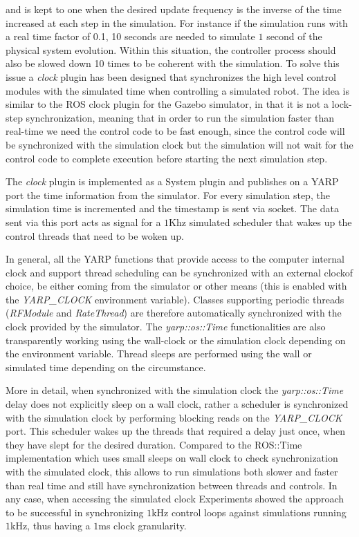 and is kept to one when the desired update frequency is the inverse of the time increased at each step in the simulation.
For instance if the simulation runs with a real time factor of 0.1, 10 seconds are needed to simulate $1$ second of the physical system evolution. Within this situation, the controller process should also be slowed down 10 times to be coherent with the simulation. To solve this issue a \emph{clock} plugin has been designed that synchronizes the high level control modules with the simulated time when controlling a simulated robot. The idea is similar to the ROS clock plugin for the Gazebo simulator, in that it is not a lock-step synchronization, meaning that in order to run the simulation faster than real-time we need the control code to be fast enough, since the control code will be synchronized with the simulation clock but the simulation will not wait for the control code to complete execution before starting the next simulation step.

The \emph{clock} plugin is implemented as a System plugin and publishes on a YARP port the time information from the simulator. For every simulation step, the simulation time is incremented and the timestamp is sent via socket. The data sent via this port acts as signal for a $1$Khz simulated scheduler that wakes up the control threads that need to be woken up.

In general, all the YARP functions that provide access to the computer internal clock and support thread scheduling can be synchronized with an external clockof choice, be either coming from the simulator or other means (this is enabled with the \emph{YARP\_CLOCK} environment variable). Classes supporting periodic threads (\emph{RFModule} and \emph{RateThread}) are therefore automatically synchronized with the clock provided by the simulator. The \emph{yarp::os::Time} functionalities are also transparently working using the wall-clock or the simulation clock depending on the environment variable. Thread sleeps are performed using the wall or simulated time depending on the circumstance.

More in detail, when synchronized with the simulation clock the \emph{yarp::os::Time} delay does not explicitly sleep on a wall clock, rather a scheduler is synchronized with the simulation clock by performing blocking reads on the \emph{YARP\_CLOCK} port. This scheduler wakes up the threads that required a delay just once, when they have slept for the desired duration. Compared to the ROS::Time implementation which uses small sleeps on wall clock to check synchronization with the simulated clock, this allows to run simulations both slower and faster than real time and still have synchronization between threads and controls. In any case, when accessing the simulated clock Experiments showed the approach to be successful in synchronizing $1$kHz control loops against simulations running $1$kHz, thus having a $1$ms clock granularity.

